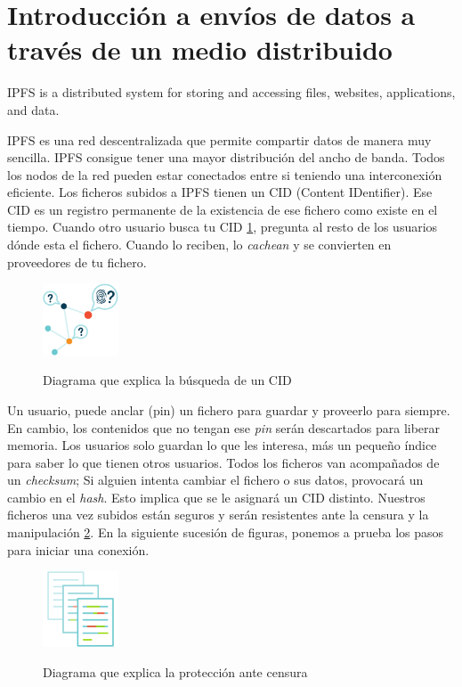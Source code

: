 \section{Introducción a envíos de datos a través de un medio distribuido}
\begin{displayquote}
    IPFS is a distributed system for storing and accessing files, websites, applications, and data. \cite{web:ipfs_whatis}
\end{displayquote}
IPFS \cite{web:ipfs} es una red descentralizada que permite compartir datos de manera muy sencilla. IPFS consigue tener una mayor distribución del ancho de banda.
Todos los nodos de la red pueden estar conectados entre si teniendo una interconexión eficiente. Los ficheros subidos a IPFS tienen un CID (Content IDentifier). Ese CID es un registro permanente de la existencia de ese fichero como existe en el tiempo.
Cuando otro usuario busca tu CID \ref{fg:looking_for_CID}, pregunta al resto de los usuarios dónde esta el fichero. Cuando lo reciben, lo \textit{cachean} y se convierten en proveedores de tu fichero.
\begin{figure}[H]
    \centering
    \includegraphics[width=0.2\textwidth]{Figures/svgviewer-png-output.png}
    \caption{Diagrama que explica la búsqueda de un CID}
    \label{fg:looking_for_CID}
    \cite{web:ipfs}
\end{figure}
Un usuario, puede anclar (pin) un fichero para guardar y proveerlo para siempre. En cambio, los contenidos que no tengan ese \textit{pin} serán descartados para liberar memoria. Los usuarios solo guardan lo que les interesa, más un pequeño índice para saber lo que tienen otros usuarios.
Todos los ficheros van acompañados de un \textit{checksum}; Si alguien intenta cambiar el fichero o sus datos, provocará un cambio en el \textit{hash}. Esto implica que se le asignará un CID distinto. Nuestros ficheros una vez subidos están seguros y serán resistentes ante la censura y la manipulación \ref{fg:keeping_IPFS_safe}.
En la siguiente sucesión de figuras, ponemos a prueba los pasos para iniciar una conexión.
\begin{center}
\begin{figure}[h!]
    \centering
    \includegraphics[width=0.2\textwidth]{Figures/svgviewer-png-output(2).png}
    \caption{Diagrama que explica la protección ante censura}
    \label{fg:keeping_IPFS_safe}
    \cite{web:ipfs}
\end{figure}
\end{center}
